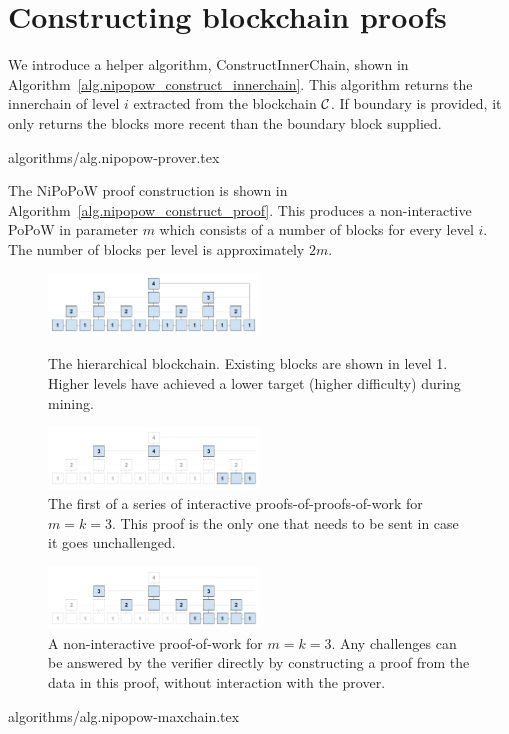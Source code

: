 \section{Constructing blockchain proofs}

We introduce a helper algorithm, ConstructInnerChain, shown in
Algorithm~\ref{alg.nipopow_construct_innerchain}. This algorithm returns the innerchain
of level $i$ extracted from the blockchain $\mathcal{C}$. If boundary is provided,
it only returns the blocks more recent than the boundary block supplied.

{algorithms/alg.nipopow-prover.tex}

The NiPoPoW proof construction is shown in Algorithm~\ref{alg.nipopow_construct_proof}.
This produces a non-interactive PoPoW in parameter $m$ which consists of a
number of blocks for every level $i$. The number of blocks per level is
approximately $2m$.

\begin{figure}[h]
    \caption{The hierarchical blockchain. Existing blocks are shown in level 1.
    Higher levels have achieved a lower target (higher difficulty) during mining.}
    \centering
    \includegraphics[width=0.5\textwidth,keepaspectratio]{figures/hierarchical-ledger.png}
    \label{fig:hierarchy}
\end{figure}

\begin{figure}[h]
    \caption{The first of a series of interactive proofs-of-proofs-of-work for
    $m = k = 3$. This proof is the only one that needs to be sent in case it
    goes unchallenged.}
    \centering
    \includegraphics[width=0.5\textwidth,keepaspectratio]{figures/interactive-popow.png}
\end{figure}

\begin{figure}[h]
    \caption{A non-interactive proof-of-work for $m = k = 3$. Any challenges
    can be answered by the verifier directly by constructing a proof from the
    data in this proof, without interaction with the prover.}
    \centering
    \includegraphics[width=0.5\textwidth,keepaspectratio]{figures/non-interactive-popow.png}
\end{figure}

{algorithms/alg.nipopow-maxchain.tex}
